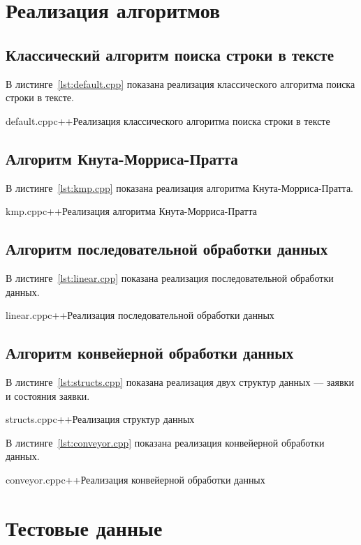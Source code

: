\section{Реализация алгоритмов}

\subsection{Классический алгоритм поиска строки в тексте}

В листинге~\ref{lst:default.cpp} показана реализация классического алгоритма поиска строки в тексте.

{default.cpp}{c++}{Реализация классического алгоритма поиска строки в тексте}

\subsection{Алгоритм Кнута-Морриса-Пратта}

В листинге~\ref{lst:kmp.cpp} показана реализация алгоритма Кнута-Морриса-Пратта.

{kmp.cpp}{c++}{Реализация алгоритма Кнута-Морриса-Пратта}

\subsection{Алгоритм последовательной обработки данных}

В листинге~\ref{lst:linear.cpp} показана реализация последовательной обработки данных.

{linear.cpp}{c++}{Реализация последовательной обработки данных}

\subsection{Алгоритм конвейерной обработки данных}

В листинге~\ref{lst:structs.cpp} показана реализация двух структур данных --- заявки и состояния заявки.

{structs.cpp}{c++}{Реализация структур данных}

В листинге~\ref{lst:conveyor.cpp} показана реализация конвейерной обработки данных.

{conveyor.cpp}{c++}{Реализация конвейерной обработки данных}

\section{Тестовые данные}

